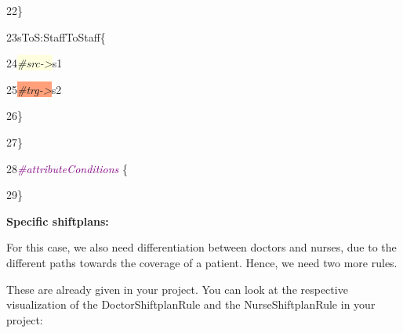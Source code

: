 {22\hspace{1cm}\}

23\hspace{1cm}sToS:StaffToStaff\{

24\hspace{1.5cm}\colorbox{LightYellow}{\textit{\#src->}}s1

25\hspace{1.5cm}\colorbox{LightSalmon}{\textit{\#trg->}}s2

26\hspace{1cm}\}
	
27\hspace{0.5cm}\}

28\hspace{0.5cm}\textcolor{Purple}{\textit{\#attributeConditions}} \{

29\hspace{0.5cm}\} \newline

}

\textbf{Specific shiftplans:}

For this case, we also need differentiation between doctors and nurses, due to the different paths towards the coverage of a patient. Hence, we need two more rules.

These are already given in your project. You can look at the respective visualization of the \textsf{DoctorShiftplanRule} and the \textsf{NurseShiftplanRule} in your project: \newline

